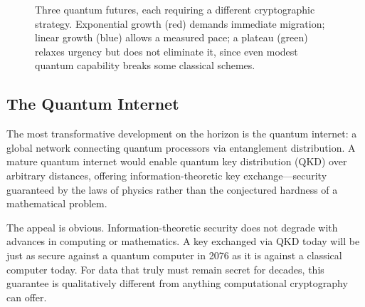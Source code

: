\begin{figure}[t]
\centering
{}
\caption{Three quantum futures, each requiring a different cryptographic strategy.  Exponential growth (red) demands immediate migration; linear growth (blue) allows a measured pace; a plateau (green) relaxes urgency but does not eliminate it, since even modest quantum capability breaks some classical schemes.}
\label{fig:ch17-quantum-futures}
\end{figure}

\subsection{The Quantum Internet}
\label{subsec:quantum-internet}

The most transformative development on the horizon is the quantum internet: a global network connecting quantum processors via entanglement distribution.  A mature quantum internet would enable quantum key distribution (QKD) over arbitrary distances, offering information-theoretic key exchange---security guaranteed by the laws of physics rather than the conjectured hardness of a mathematical problem.

The appeal is obvious.  Information-theoretic security does not degrade with advances in computing or mathematics.  A key exchanged via QKD today will be just as secure against a quantum computer in 2076 as it is against a classical computer today.  For data that truly must remain secret for decades, this guarantee is qualitatively different from anything computational cryptography can offer.

